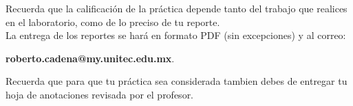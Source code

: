 	Recuerda que la calificación de la práctica depende tanto del trabajo que realices en el laboratorio, como de lo preciso de tu reporte. \\

	La entrega de los reportes se hará en formato PDF (sin excepciones) y al correo:

	\begin{center}
		\textbf{roberto.cadena@my.unitec.edu.mx}. \\
	\end{center}

	Recuerda que para que tu práctica sea considerada tambien debes de entregar tu hoja de anotaciones revisada por el profesor.



